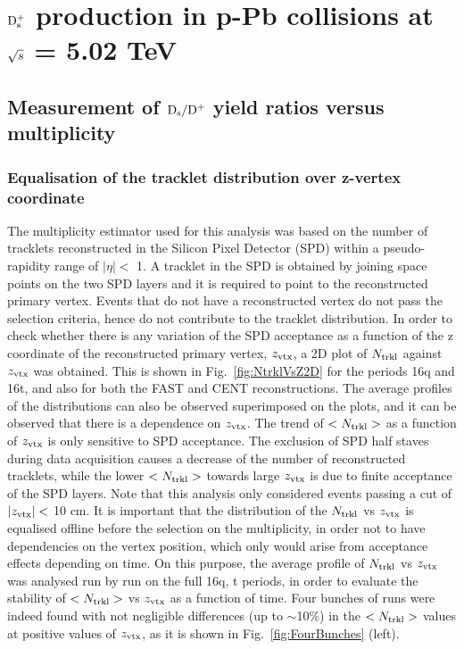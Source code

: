 \chapter{${\rm D_s^+}$ production in p-Pb collisions at $\sqrt{s}$ = 5.02 TeV}

\section{Measurement of ${\rm D_s}/{\rm D^+}$ yield ratios versus multiplicity}
\subsection {Equalisation of the tracklet distribution over z-vertex coordinate}
\label{subsec:zVxtEq}
The multiplicity estimator used for this analysis was based on the number of tracklets reconstructed in the
Silicon Pixel Detector (SPD) within a pseudo-rapidity range of $|\eta| <$ 1. A tracklet in the SPD is obtained by
joining space points on the two SPD layers and it is required to point to the reconstructed primary vertex. 
Events that do not have a reconstructed vertex do not pass the selection criteria, hence
do not contribute to the tracklet distribution.
 In order to check whether there is any variation of the SPD acceptance as a function of the z coordinate
of the reconstructed primary vertex, $z_{\rm vtx}$, a 2D plot of $N_{\rm trkl}$ against $z_{\rm vtx}$ was obtained. This is shown in
Fig.~\ref{fig:NtrklVsZ2D} for the periods 16q and 16t, and also for both the FAST and CENT reconstructions.
 The average profiles of the distributions can also be observed superimposed on the plots, and it can be
 observed that there is a dependence on $z_{\rm vtx}$. The trend of $<N_{\rm trkl}>$ as a function of $z_{\rm vtx}$ is only sensitive to SPD acceptance.
 The exclusion of SPD half staves during data acquisition causes a decrease of the number of reconstructed tracklets,
 while the lower $<N_{\rm trkl}>$ towards large $z_{\rm vtx}$ is due to finite acceptance of the SPD layers. 
Note that this analysis only considered events passing a cut of $| z_{\rm vtx}| <$ 10 cm.
 It is important that the distribution of the $N_{\rm trkl}$ vs $z_{\rm vtx}$ is equalised offline before the selection on the multiplicity, 
in order not to have dependencies on the
 vertex position, which only would arise from acceptance effects depending on time. On this purpose, 
 the average profile of $N_{\rm trkl}$ vs $z_{\rm vtx}$ was analysed run by run on the full 
 16q, t periods, in order to evaluate the stability of $<N_{\rm trkl}>$ vs $z_{\rm vtx}$ as a function of time. Four bunches of runs were indeed
 found with not negligible differences (up to $\sim$10\%) in the $<N_{\rm trkl}>$ values at positive values of $z_{\rm vtx}$, as it is shown in Fig.~\ref{fig:FourBunches} (left).
